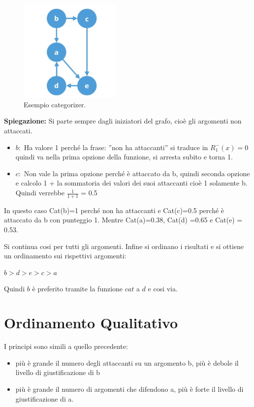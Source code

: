     \begin{figure}[htp]
        \centering
        \includegraphics[width=5cm, keepaspectratio]{img/Cap8/quantitativo2.png}
        \caption{Esempio categorizer.}
    \end{figure}
    \noindent \textbf{Spiegazione: } Si parte sempre dagli iniziatori del grafo,
    cioè gli argomenti non attaccati.
    \begin{itemize}
        \item $b:$ Ha valore 1 perché la frase: ”non ha attaccanti” si traduce
              in $R^-_1(x) = 0$ quindi va nella prima opzione della funzione, si
              arresta subito e torna 1.
        \item $c:$ Non vale la prima opzione perché è attaccato da b, quindi
              seconda opzione e calcolo 1 + la sommatoria dei valori dei suoi
              attaccanti cioè 1 solamente b. Quindi verrebbe $\frac{1}{1+1}$ = 0.5
    \end{itemize}
    In questo caso Cat(b)=1 perché non ha attaccanti e Cat(c)=0.5 perché è
    attaccato da b con punteggio 1. Mentre Cat(a)=0.38, Cat(d) =0.65 e Cat(e) =
    0.53.

    \vspace{0.3cm}

    Si continua cosi per tutti gli argomenti. Infine si ordinano i risultati e
    si ottiene un ordinamento sui rispettivi argomenti:
    \begin{center}
        $b>d>e>c>a$
    \end{center}
    Quindi $b$ è preferito tramite la funzione $cat$ a $d$ e cosi via.
    \section{Ordinamento Qualitativo}
    I principi sono simili a quello precedente:
    \begin{itemize}
        \item più è grande il numero degli attaccanti su un argomento b, più è
              debole il livello di giustificazione di b
        \item più è grande il numero di argomenti che difendono a, più è forte
              il livello di giustificazione di a.
    \end{itemize}
